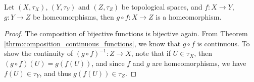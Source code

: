 \begin{theorem}\label{thrm:composition_homeomorphisms}
	Let $(X, \tau_X)$, $(Y, \tau_Y)$ and $(Z, \tau_Z)$ be topological spaces, and $f: X\to Y$, $g: Y\to Z$ be homeomorphisms, then $g\circ f: X\to Z$ is a homeomorphism.
\end{theorem}

\begin{proof}
	The composition of bijective functions is bijective again. From Theorem \ref{thrm:composition_continuous_functions}, we know that $g\circ f$ is continuous. To show the continuity of $(g\circ f)^{-1}: Z\to X$, note that if $U\in\tau_X$, then $(g\circ f)(U) = g(f(U))$, and since $f$ and $g$ are homeomorphisms, we have $f(U)\in \tau_Y$, and thus $g(f(U))\in\tau_Z$.
\end{proof}